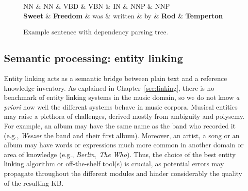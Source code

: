\begin{figure}[!htb]
\centering
\begin{dependency}
\begin{deptext}[column sep=.0cm]
NN \& NN \& VBD \& VBN \& IN \& NNP \& NNP \\
\textbf{Sweet} \& \textbf{Freedom} \& was \& written \& by \& \textbf{Rod} \& \textbf{Temperton} \\
\end{deptext}




\end{dependency}
\vspace*{-5mm}
\caption{Example sentence with dependency parsing tree.}
\label{fig:kb:sampletree}
\end{figure}


\subsection{Semantic processing: entity linking}
\label{sec:kb:method:entitylinking}

Entity linking acts as a semantic bridge between plain text and a reference knowledge inventory. %
As explained in Chapter~\ref{sec:linking}, there is no benchmark of entity linking systems in the music domain, so we do not know \textit{a priori} how well the different systems behave in music corpora. Musical entities may raise a plethora of challenges, derived mostly from ambiguity and polysemy. For example, an album may have the same name as the band who recorded it (e.g., \textit{Weezer} the band and their first album). Moreover, an artist, a song or an album may have words or expressions much more common in another domain or area of knowledge (e.g., \textit{Berlin, The Who}). Thus, the choice of the best entity linking algorithm or off-the-shelf tool(s) is crucial, as potential errors may propagate throughout the different modules and hinder considerably the quality of the resulting KB.

